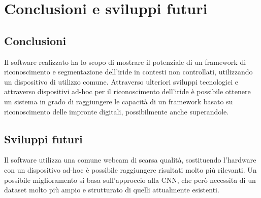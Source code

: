 \graphicspath{ {img/6/} }
\chapter{Conclusioni e sviluppi futuri}\label{cap:conclusioni}
\thispagestyle{empty}
\newpage

\section{Conclusioni}
\vspace{8mm}
Il software realizzato ha lo scopo di mostrare il potenziale di un framework di riconoscimento e segmentazione dell'iride in contesti non controllati, utilizzando un dispositivo di utilizzo comune.
Attraverso ulteriori sviluppi tecnologici e attraverso dispositivi ad-hoc per il riconoscimento dell'iride è possibile ottenere un sistema in grado di raggiungere le capacità di un framework basato su riconoscimento delle impronte digitali, possibilmente anche superandole.

\section{Sviluppi futuri}
\vspace{8mm}
Il software utilizza una comune webcam di scarsa qualità, sostituendo l'hardware con un dispositivo ad-hoc è possibile raggiungere risultati molto più rilevanti.
Un possibile miglioramento si basa sull'approccio alla CNN, che però necessita di un dataset molto più ampio e strutturato di quelli attualmente esistenti.
